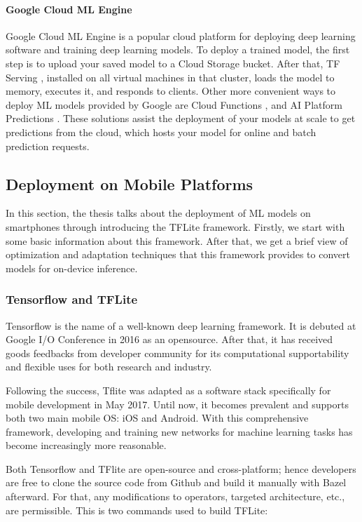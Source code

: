 \paragraph{Google Cloud ML Engine}
Google Cloud ML Engine \cite{googlecloudml} is a popular cloud platform for deploying deep learning software and training deep learning models. To deploy a trained model, the first step is to upload your saved model to a Cloud Storage bucket. After that, TF Serving , installed on all virtual machines in that cluster, loads the model to memory, executes it, and responds to clients. Other more convenient ways to deploy ML models provided by Google are Cloud Functions \cite{cloudfunctions}, and AI Platform Predictions \cite{platformprediction}.
These solutions assist the deployment of your models at scale to get predictions from the cloud, which hosts your model for online and batch prediction requests. \par


\subsection{Deployment on Mobile Platforms}
In this section, the thesis talks about the deployment of ML models on smartphones through introducing the TFLite framework. Firstly, we start with some basic information about this framework. After that, we get a brief view of optimization and adaptation techniques that this framework provides to convert models for on-device inference. \par
\subsubsection{Tensorflow and TFLite}
Tensorflow is the name of a well-known deep learning framework. It is debuted at Google I/O Conference in 2016 as an opensource. After that, it has received goods feedbacks from developer community for its computational supportability and flexible uses for both research and industry. \par

Following the success, Tflite was adapted as a software stack specifically for mobile development in May 2017. Until now, it becomes prevalent and supports both two main mobile OS: iOS and Android. With this comprehensive framework, developing and training new networks for machine learning tasks has become increasingly more reasonable. \par

Both Tensorflow and TFlite are open-source and cross-platform; hence developers are free to clone the source code from Github and build it manually with Bazel afterward. For that, any modifications to operators, targeted architecture, etc., are permissible. This is two commands used to build TFLite: \par

